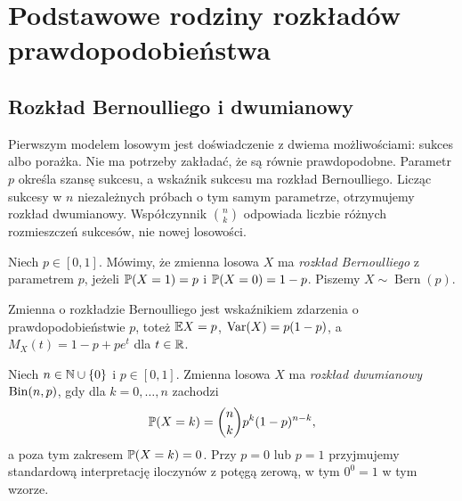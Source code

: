 \chapter{Podstawowe rodziny rozkładów prawdopodobieństwa}
\label{ch:distributions}

\section{Rozkład Bernoulliego i dwumianowy}
Pierwszym modelem losowym jest doświadczenie z dwiema
możliwościami: sukces albo porażka. Nie ma potrzeby zakładać,
że są równie prawdopodobne. Parametr $p$ określa szansę sukcesu,
a wskaźnik sukcesu ma rozkład Bernoulliego. Licząc sukcesy
w $n$ niezależnych próbach o tym samym parametrze, otrzymujemy
rozkład dwumianowy. Współczynnik $\binom nk$ odpowiada
liczbie różnych rozmieszczeń sukcesów, nie nowej losowości.

\begin{definicja}
Niech $p\in[0,1]$. Mówimy, że zmienna losowa $X$ ma
\emph{rozkład Bernoulliego} z parametrem $p$, jeżeli
$\mathbb{P}(X=1)=p$ i $\mathbb{P}(X=0)=1-p$.
Piszemy $X\sim\operatorname{Bern}(p)$.
\end{definicja}

Zmienna o rozkładzie Bernoulliego jest wskaźnikiem zdarzenia
o prawdopodobieństwie $p$, toteż
$\mathbb{E} X=p$, $\operatorname{Var}(X)=p(1-p)$, a
$M_X(t)=1-p+pe^t$ dla $t\in\mathbb{R}$.

\begin{definicja}
Niech $n\in\mathbb{N}\cup\{0\}$ i $p\in[0,1]$.
Zmienna losowa $X$ ma \emph{rozkład dwumianowy} $\operatorname{Bin}(n,p)$,
gdy dla $k=0,\ldots,n$ zachodzi
\begin{equation}\label{eq:binomial}
\mathbb{P}(X=k)=\binom nk p^k(1-p)^{n-k},
\end{equation}
a poza tym zakresem $\mathbb{P}(X=k)=0$. Przy $p=0$ lub $p=1$
przyjmujemy standardową interpretację iloczynów z potęgą zerową,
w tym $0^0=1$ w tym wzorze.
\end{definicja}

